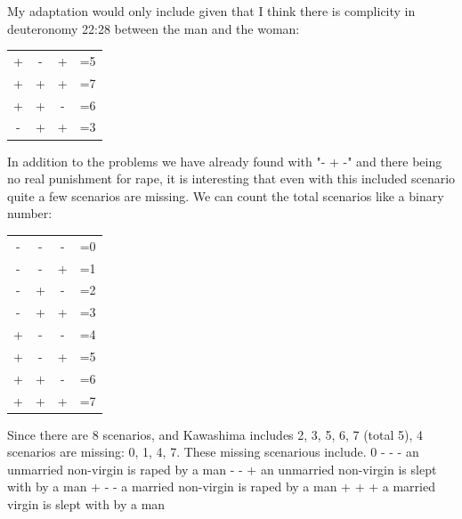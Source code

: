 \documentclass[11pt]{article}
\begin{document}
My adaptation would only include given that I think there is complicity in deuteronomy 22:28 between the man and the woman: \newline 
\begin{tabular}{ c c c c }
 + & - & + & =5\\ 
 + & + & + & =7 \\  
 + & + & - & =6 \\
 - & + & + & =3 \\
\end{tabular} \newline 

In addition to the problems we have already found with "- + -" and there being no real punishment for rape, it is interesting that even with this included scenario quite a few scenarios are missing. We can count the total scenarios like a binary number: \newline


\begin{tabular}{ c c c c }
 - & - & - & =0\\ 
 - & - & + & =1 \\  
 - & + & - & =2 \\
 - & + & + & =3 \\
 + & - & - & =4 \\
 + & - & + & =5 \\  
 + & + & - & =6 \\
 + & + & + & =7 \\

\end{tabular} \newline

Since there are 8 scenarios, and Kawashima includes 2, 3, 5, 6, 7 (total 5), 4 scenarios are missing: 0, 1, 4, 7. These missing scenarious include. 
0 - - - an unmarried non-virgin is raped by a man  - - + an unmarried non-virgin is slept with by a man  + - - a married non-virgin is raped by a man  + + + a married virgin is slept with by a man \newline
\end{document}
